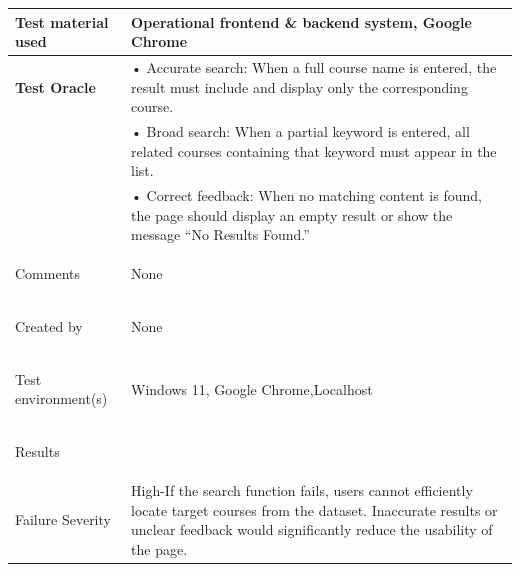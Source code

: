 \begin{table}[h]
\begin{tabularx}{\linewidth}{>{\bfseries}l X}
Test material used & Operational frontend \& backend system, Google Chrome \\ \hline

Test Oracle & • Accurate search: When a full course name is entered, the result must include and display only the corresponding course.\\
&• Broad search: When a partial keyword is entered, all related courses containing that keyword must appear in the list.\\
&• Correct feedback: When no matching content is found, the page should display an empty result or show the message “No Results Found.” \\ \hline

Comments & None \\ \hline

Created by & None \\ \hline

Test environment(s) & Windows 11, Google Chrome,Localhost\\ \hline

Results &  \\ \hline

Failure Severity& High-If the search function fails, users cannot efficiently locate target courses from the dataset. Inaccurate results or unclear feedback would significantly reduce the usability of the page.\\ \hline
\end{tabularx}
\end{table}


